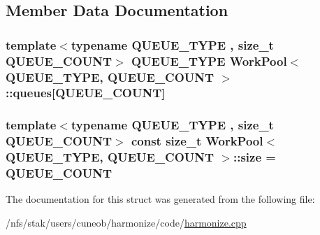 \subsection{Member Data Documentation}
\hypertarget{structWorkPool_a02a6dd42781845f370b959d06c3bfebd}{
\subsubsection[{queues}]{\setlength{\rightskip}{0pt plus 5cm}template$<$typename Q\-U\-E\-U\-E\-\_\-\-T\-Y\-P\-E , size\-\_\-t Q\-U\-E\-U\-E\-\_\-\-C\-O\-U\-N\-T$>$ Q\-U\-E\-U\-E\-\_\-\-T\-Y\-P\-E {\bf Work\-Pool}$<$ Q\-U\-E\-U\-E\-\_\-\-T\-Y\-P\-E, Q\-U\-E\-U\-E\-\_\-\-C\-O\-U\-N\-T $>$\-::queues\mbox{[}Q\-U\-E\-U\-E\-\_\-\-C\-O\-U\-N\-T\mbox{]}}}\label{structWorkPool_a02a6dd42781845f370b959d06c3bfebd}
\hypertarget{structWorkPool_a95561c6d698b8a6bf0d791ea0ba229d7}{
\subsubsection[{size}]{\setlength{\rightskip}{0pt plus 5cm}template$<$typename Q\-U\-E\-U\-E\-\_\-\-T\-Y\-P\-E , size\-\_\-t Q\-U\-E\-U\-E\-\_\-\-C\-O\-U\-N\-T$>$ const size\-\_\-t {\bf Work\-Pool}$<$ Q\-U\-E\-U\-E\-\_\-\-T\-Y\-P\-E, Q\-U\-E\-U\-E\-\_\-\-C\-O\-U\-N\-T $>$\-::size = Q\-U\-E\-U\-E\-\_\-\-C\-O\-U\-N\-T\hspace{0.3cm}{\ttfamily [static]}}}\label{structWorkPool_a95561c6d698b8a6bf0d791ea0ba229d7}


The documentation for this struct was generated from the following file\-:\begin{DoxyCompactItemize}
\item 
/nfs/stak/users/cuneob/harmonize/code/\hyperlink{harmonize_8cpp}{harmonize.\-cpp}\end{DoxyCompactItemize}

